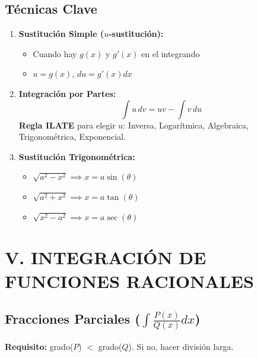 \documentclass[12pt, a4paper]{article}
\begin{document}
\subsection*{Técnicas Clave}

\begin{enumerate}
    \item \textbf{Sustitución Simple ($u$-sustitución):}
    \begin{itemize}
        \item Cuando hay $g(x)$ y $g'(x)$ en el integrando
        \item $u=g(x)$, $du=g'(x)dx$
    \end{itemize}
    
    \item \textbf{Integración por Partes:}
    \[
    \int u\, dv = uv - \int v\, du
    \]
    \textbf{Regla ILATE} para elegir $u$: Inversa, Logarítmica, Algebraica, Trigonométrica, Exponencial.
    
    \item \textbf{Sustitución Trigonométrica:}
    \begin{itemize}
        \item $\sqrt{a^{2}-x^{2}} \implies x=a\sin(\theta)$
        \item $\sqrt{a^{2}+x^{2}} \implies x=a\tan(\theta)$
        \item $\sqrt{x^{2}-a^{2}} \implies x=a\sec(\theta)$
    \end{itemize}
\end{enumerate}

\section*{V. INTEGRACIÓN DE FUNCIONES RACIONALES}

\subsection*{Fracciones Parciales ($\int\frac{P(x)}{Q(x)}dx$)}

\textbf{Requisito:} grado($P$) $<$ grado($Q$). Si no, hacer división larga.
\end{document}
